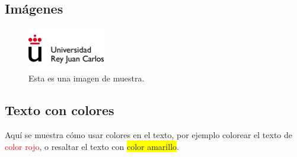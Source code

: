 \documentclass{article}
\begin{document}
\subsection{Imágenes}
\begin{figure}[h]
    \centering
    \includegraphics[width=0.3\textwidth]{URJC-Logo.png}
    \caption{Esta es una imagen de muestra.}
    \label{fig:example}
\end{figure}

\subsection{Texto con colores}

Aquí se muestra cómo usar colores en el texto, por ejemplo colorear el texto de \textcolor{red}{color rojo}, o resaltar el texto con \colorbox{yellow}{color amarillo}.
\end{document}
